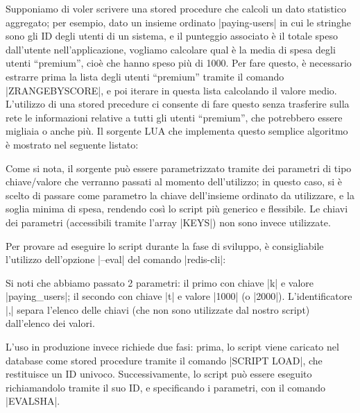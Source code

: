 Supponiamo di voler scrivere una stored procedure che calcoli un dato statistico aggregato; per
esempio, dato un insieme ordinato \cverb|paying-users| in cui le stringhe sono gli ID degli utenti di
un sistema, e il punteggio associato è il totale speso dall'utente nell'applicazione, vogliamo
calcolare qual è la media di spesa degli utenti ``premium'', cioè che hanno speso più di
\SI{1000}{\EUR}. Per fare questo, è necessario estrarre prima la lista degli utenti ``premium''
tramite il comando \cverb|ZRANGEBYSCORE|, e poi iterare in questa lista calcolando il valore medio.
L'utilizzo di una stored precedure ci consente di fare questo senza trasferire sulla rete le
informazioni relative a tutti gli utenti ``premium'', che potrebbero essere migliaia o anche più. Il
sorgente LUA che implementa questo semplice algoritmo è mostrato nel seguente listato:

\medskip
{}

Come si nota, il sorgente può essere parametrizzato tramite dei parametri di tipo chiave/valore
che verranno passati al momento dell'utilizzo; in questo caso, si è scelto di passare come parametro 
la chiave dell'insieme ordinato da utilizzare, e la soglia minima di spesa, rendendo così lo script 
più generico e flessibile. Le chiavi dei parametri (accessibili tramite l'array \cverb|KEYS|) non
sono invece utilizzate.

Per provare ad eseguire lo script durante la fase di sviluppo, è consigliabile l'utilizzo
dell'opzione \cverb|--eval| del comando \cverb|redis-cli|:


Si noti che abbiamo passato 2 parametri: il primo con chiave \cverb|k| e valore \cverb|paying_users|;
il secondo con chiave \cverb|t| e valore \cverb|1000| (o \cverb|2000|). L'identificatore \cverbfull|,|
separa l'elenco delle chiavi (che non sono utilizzate dal nostro script) dall'elenco dei valori.

L'uso in produzione invece richiede due fasi: prima, lo script viene caricato nel database
come stored procedure tramite il comando \cverb|SCRIPT LOAD|, che restituisce un ID univoco. 
Successivamente, lo script può essere eseguito richiamandolo tramite il suo ID, e specificando 
i parametri, con il comando \cverb|EVALSHA|.

